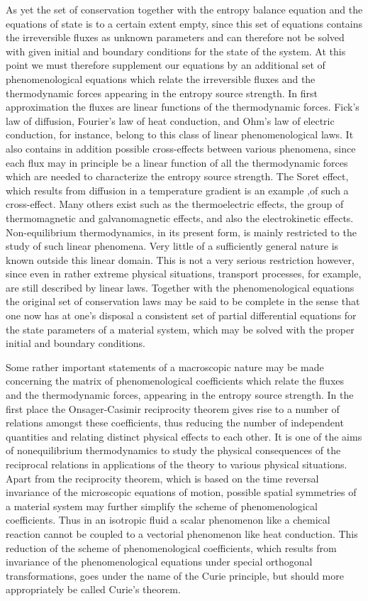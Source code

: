 As yet the set of conservation together with the entropy balance equation and the equations of state is to a certain extent empty, since this set of equations contains the irreversible fluxes as unknown parameters and can therefore not be solved with given initial and boundary conditions for the state of the system. At this point we must therefore supplement our equations by an additional set of phenomenological equations which relate the irreversible fluxes and the thermodynamic forces appearing in the entropy source strength. In first approximation the fluxes are linear functions of the thermodynamic forces. Fick's law of diffusion, Fourier's law of heat conduction, and Ohm's law of electric conduction, for instance, belong to this class of linear phenomenological laws. It also contains in addition possible cross-effects between various phenomena, since each flux may in principle be a linear function of all the thermodynamic forces which are needed to characterize the entropy source strength. The Soret effect, which results from diffusion in a temperature gradient is an example ,of such a cross-effect. Many others exist such as the thermoelectric effects, the group of thermomagnetic and galvanomagnetic effects, and also the electrokinetic effects. Non-equilibrium thermodynamics, in its present form, is mainly restricted to the study of such linear phenomena. Very little of a sufficiently general nature is known outside this linear domain. This is not a very serious restriction however, since even in rather extreme physical situations, transport processes, for example, are still described by linear laws. Together with the phenomenological equations the original set of conservation laws may be said to be complete in the sense that one now has at one's disposal a consistent set of partial differential equations for the state parameters of a material system, which may be solved with the proper initial and boundary conditions.

Some rather important statements of a macroscopic nature may be made concerning the matrix of phenomenological coefficients which relate the fluxes and the thermodynamic forces, appearing in the entropy source strength. In the first place the Onsager-Casimir reciprocity theorem gives rise to a number of relations amongst these coefficients, thus reducing the number of independent quantities and relating distinct physical effects to each other. It is one of the aims of nonequilibrium thermodynamics to study the physical consequences of the reciprocal relations in applications of the theory to various physical situations. Apart from the reciprocity theorem, which is based on the time reversal invariance of the microscopic equations of motion, possible spatial symmetries of a material system may further simplify the scheme of phenomenological coefficients. Thus in an isotropic fluid a scalar phenomenon like a chemical reaction cannot be coupled to a vectorial phenomenon like heat conduction. This reduction of the scheme of phenomenological coefficients, which results from invariance of the phenomenological equations under special orthogonal transformations, goes under the name of the Curie principle, but should more appropriately be called Curie's theorem.

